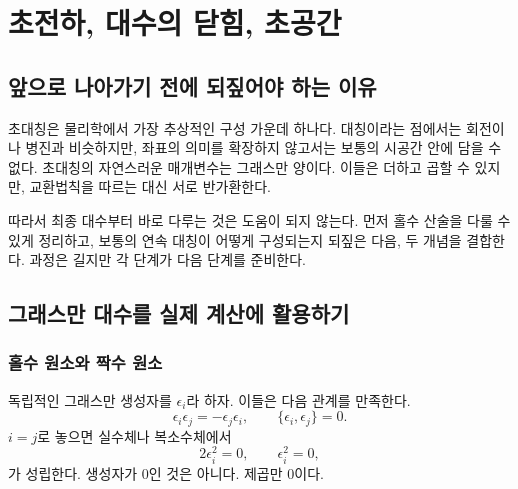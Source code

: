 \chapter{초전하, 대수의 닫힘, 초공간}


\section{앞으로 나아가기 전에 되짚어야 하는 이유}

초대칭은 물리학에서 가장 추상적인 구성 가운데 하나다. 대칭이라는 점에서는 회전이나 병진과 비슷하지만, 좌표의 의미를 확장하지 않고서는 보통의 시공간 안에 담을 수 없다. 초대칭의 자연스러운 매개변수는 그래스만 양이다. 이들은 더하고 곱할 수 있지만, 교환법칙을 따르는 대신 서로 반가환한다.

따라서 최종 대수부터 바로 다루는 것은 도움이 되지 않는다. 먼저 홀수 산술을 다룰 수 있게 정리하고, 보통의 연속 대칭이 어떻게 구성되는지 되짚은 다음, 두 개념을 결합한다. 과정은 길지만 각 단계가 다음 단계를 준비한다.

\section{그래스만 대수를 실제 계산에 활용하기}

\subsection{홀수 원소와 짝수 원소}

독립적인 그래스만 생성자를 \(\epsilon_i\)라 하자. 이들은 다음 관계를 만족한다.
\begin{equation}
\epsilon_i\epsilon_j=-\epsilon_j\epsilon_i,
\qquad
\{\epsilon_i,\epsilon_j\}=0.
\end{equation}
\(i=j\)로 놓으면 실수체나 복소수체에서
\begin{equation}
2\epsilon_i^2=0,
\qquad
\epsilon_i^2=0,
\end{equation}
가 성립한다. 생성자가 0인 것은 아니다. 제곱만 0이다.

